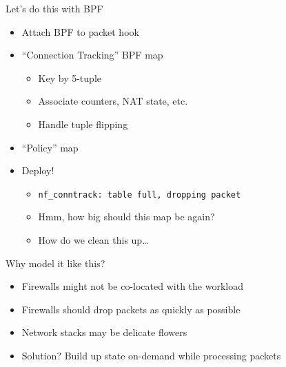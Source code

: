 \documentclass[black,white]{beamer}
\newcommand{\cmark}{\ding{51}}%
\newcommand{\bigcmark}{{\large\textcolor{green}\cmark}}
\newcommand{\xmark}{\ding{55}}
\newcommand{\bigxmark}{{\large\textcolor{red}\xmark}}
\newcommand\sectioncolor{\setbeamercolor{background canvas}{bg=layerblue}}
\newcommand\newsectionpage[1]{
    \section{}
    {\sectioncolor
        \begin{frame}
            \vfill
            \centering
            \section{#1}
            \begin{beamercolorbox}[sep=8pt,center,shadow=true,rounded=true]{title}
                \usebeamerfont{title}\insertsectionhead\par%
            \end{beamercolorbox}
            \vfill
        \end{frame}
    }
    \section{#1}
}
\begin{document}
    \begin{frame}[fragile]{Let's do this with BPF}
        \begin{itemize}
            \item Attach BPF to packet hook \bigcmark \medskip
            \item ``Connection Tracking'' BPF map \bigcmark \smallskip
            \begin{itemize}
                \item Key by 5-tuple \medskip
                \item Associate counters, NAT state, etc. \medskip
		        \item Handle tuple flipping \medskip
            \end{itemize}
            \item ``Policy'' map \bigcmark \medskip
            \item Deploy! \bigxmark \smallskip
            \begin{itemize}
                \item \verb+nf_conntrack: table full, dropping packet+ \medskip
                \item Hmm, how big should this map be again? \medskip
                \item How do we clean this up\ldots \medskip
            \end{itemize}
        \end{itemize}
    \end{frame}



    \begin{frame}{Why model it like this?}
        \begin{itemize}
            \item Firewalls might not be co-located with the workload \bigskip
            \item Firewalls should drop packets as quickly as possible \bigskip
            \item Network stacks may be delicate flowers \bigskip
            \item Solution? Build up state on-demand while processing packets \bigskip
        \end{itemize}
    \end{frame}
\end{document}
